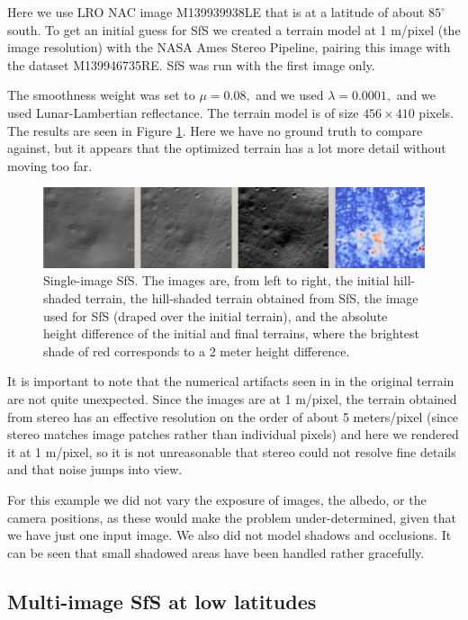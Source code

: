\documentclass[12pt,oneside]{article}
\begin{document}
Here we use LRO NAC image M139939938LE that is at a latitude of about
$85^\circ$ south. To get an initial guess for SfS we created a terrain
model at 1 m/pixel (the image resolution) with the NASA Ames Stereo
Pipeline, pairing this image with the dataset M139946735RE. SfS was run
with the first image only.

The smoothness weight was set to $\mu=0.08,$ and we used
$\lambda=0.0001,$ and we used Lunar-Lambertian
reflectance. The terrain model is of size $456 \times 410$ pixels. 
The results are seen in Figure \ref{fig:sfs1}.  Here we
have no ground truth to compare against, but it appears that the
optimized terrain has a lot more detail without moving too far.

\begin{figure}[h!]
\begin{center}
\includegraphics[width=6in]{figures/sfs1.jpg}
\caption[sfs]{Single-image SfS. The images are, from left to right, the
  initial hill-shaded terrain, the hill-shaded terrain obtained from
  SfS, the image used for SfS (draped over the initial terrain), and the
  absolute height difference of the initial and final terrains, where
  the brightest shade of red corresponds to a 2 meter height
  difference.}
\label{fig:sfs1}
\end{center}
\end{figure}

It is important to note that the numerical artifacts seen in in the
original terrain are not quite unexpected. Since the images are at 1
m/pixel, the terrain obtained from stereo has an effective
resolution on the order of about 5 meters/pixel (since stereo matches
image patches rather than individual pixels) and here we rendered it at
1 m/pixel, so it is not unreasonable that stereo could not resolve
fine details and that noise jumps into view. 


For this example we did not vary the exposure of images, the albedo, or
the camera positions, as these would make the problem under-determined,
given that we have just one input image.  We also did not model shadows
and occlusions. It can be seen that small shadowed areas have been
handled rather gracefully.

\subsection{Multi-image SfS at low latitudes}
\label{multiple}
\end{document}
